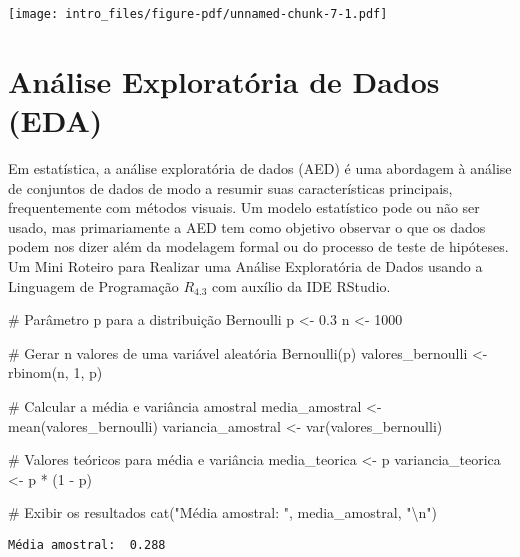 \documentclass[
  letterpaper,
  DIV=11,
  numbers=noendperiod]{scrreprt}
\newenvironment{Shaded}{\begin{snugshade}}{\end{snugshade}}
\newcommand{\CommentTok}[1]{\textcolor[rgb]{0.37,0.37,0.37}{#1}}
\newcommand{\DecValTok}[1]{\textcolor[rgb]{0.68,0.00,0.00}{#1}}
\newcommand{\FloatTok}[1]{\textcolor[rgb]{0.68,0.00,0.00}{#1}}
\newcommand{\FunctionTok}[1]{\textcolor[rgb]{0.28,0.35,0.67}{#1}}
\newcommand{\NormalTok}[1]{\textcolor[rgb]{0.00,0.23,0.31}{#1}}
\newcommand{\OtherTok}[1]{\textcolor[rgb]{0.00,0.23,0.31}{#1}}
\newcommand{\SpecialCharTok}[1]{\textcolor[rgb]{0.37,0.37,0.37}{#1}}
\newcommand{\StringTok}[1]{\textcolor[rgb]{0.13,0.47,0.30}{#1}}
\begin{document}
\texttt{[image: intro\_files/figure-pdf/unnamed-chunk-7-1.pdf]}

\section{Análise Exploratória de Dados
(EDA)}\label{anuxe1lise-exploratuxf3ria-de-dados-eda}

Em estatística, a análise exploratória de dados (AED) é uma abordagem à
análise de conjuntos de dados de modo a resumir suas características
principais, frequentemente com métodos visuais. Um modelo estatístico
pode ou não ser usado, mas primariamente a AED tem como objetivo
observar o que os dados podem nos dizer além da modelagem formal ou do
processo de teste de hipóteses. Um Mini Roteiro para Realizar uma
Análise Exploratória de Dados usando a Linguagem de Programação
\(R_{4.3}\) com auxílio da IDE RStudio.

\begin{Shaded}
\begin{Highlighting}[]
\CommentTok{\# Parâmetro p para a distribuição Bernoulli}
\NormalTok{p }\OtherTok{\textless{}{-}} \FloatTok{0.3}
\NormalTok{n }\OtherTok{\textless{}{-}} \DecValTok{1000}

\CommentTok{\# Gerar n valores de uma variável aleatória Bernoulli(p)}
\NormalTok{valores\_bernoulli }\OtherTok{\textless{}{-}} \FunctionTok{rbinom}\NormalTok{(n, }\DecValTok{1}\NormalTok{, p)}

\CommentTok{\# Calcular a média e variância amostral}
\NormalTok{media\_amostral }\OtherTok{\textless{}{-}} \FunctionTok{mean}\NormalTok{(valores\_bernoulli)}
\NormalTok{variancia\_amostral }\OtherTok{\textless{}{-}} \FunctionTok{var}\NormalTok{(valores\_bernoulli)}

\CommentTok{\# Valores teóricos para média e variância}
\NormalTok{media\_teorica }\OtherTok{\textless{}{-}}\NormalTok{ p}
\NormalTok{variancia\_teorica }\OtherTok{\textless{}{-}}\NormalTok{ p }\SpecialCharTok{*}\NormalTok{ (}\DecValTok{1} \SpecialCharTok{{-}}\NormalTok{ p)}

\CommentTok{\# Exibir os resultados}
\FunctionTok{cat}\NormalTok{(}\StringTok{"Média amostral: "}\NormalTok{, media\_amostral, }\StringTok{"}\SpecialCharTok{\textbackslash{}n}\StringTok{"}\NormalTok{)}
\end{Highlighting}
\end{Shaded}

\begin{verbatim}
Média amostral:  0.288 
\end{verbatim}
\end{document}
